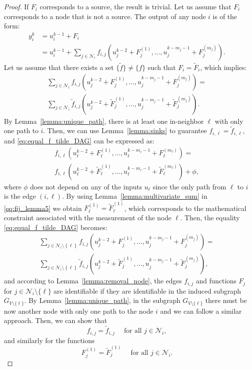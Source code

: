 \documentclass[letterpaper,10pt,journal]{IEEEtran}
\newcommand{\brc}[1]{\left\{#1\right\}}
\newcommand{\NN}{\mathcal{N}}
\begin{document}
\begin{proof}
    If $F_i$ corresponds to a source, the result is trivial. Let us assume that $F_i$ corresponds to a node that is not a source. 
    The output of any node $i$ is of the form:
    \begin{align}
        y_i^k&=u_i^{k-1}+F_i\nonumber\\
        &=u_i^{k-1}\!+\!\sum_{j\in\NN_i}\!f_{i,j}(u_{j}^{k-2}\!+\!F_{j}^{(1)},\ldots,u_{j}^{k-m_{j}-1}\!+\!F_{j}^{(m_{j})}).\nonumber
    \end{align}
    Let us assume that
    there exists a set $\{\tilde f\}\neq \{ f\}$ such that $F_i=\tilde F_i$, which implies:
\begin{multline}\label{eq:equal_f_tilde_DAG}
        \sum_{j\in\NN_i}f_{i,j}(u_{j}^{k-2}+F_{j}^{(1)},\ldots,u_{j}^{k-m_{j}-1}+F_{j}^{(m_{j})})=\\
        \sum_{j\in\NN_i}\tilde f_{i,j}(u_{j}^{k-2}+\tilde F_{j}^{(1)},\ldots,u_{j}^{k-m_{j}-1}+\tilde F_{j}^{(m_{j})}).
    \end{multline}
By Lemma~\ref{lemma:unique_path}, there is at least one in-neighbor $\ell$ with only one path to $i$. 
Then, we can use Lemma~\ref{lemma:sinks} to guarantee $f_{i,\ell}=\tilde f_{i,\ell}$, and \eqref{eq:equal_f_tilde_DAG} can be expressed as:
\begin{multline}\label{eq:fij_lemma5}
    f_{i,\ell}(u_{\ell}^{k-2}+F_{\ell}^{(1)},\ldots,u_{\ell}^{k-m_{\ell}-1}+F_{\ell}^{(m_{\ell})})=\\
         f_{i,\ell}(u_{\ell}^{k-2}+\tilde F_{\ell}^{(1)},\ldots,u_{\ell}^{k-m_{\ell}-1}+\tilde F_{\ell}^{(m_{\ell})})+\phi,
\end{multline}
where $\phi$ does not depend on any of the inputs $u_\ell$ since the only path from $\ell$ to $i$ is the edge $(i,\ell)$. 
By using Lemma~\ref{lemma:multivariate_sum} in \eqref{eq:fij_lemma5} we obtain $F_{\ell}^{(1)}=\tilde F_{\ell}^{(1)}$, which corresponds to the mathematical constraint associated with the measurement of the node $\ell$.
Then, the equality \eqref{eq:equal_f_tilde_DAG} becomes:
\begin{multline}\label{eq:node_i2_Volterra}
\sum_{j\in\NN_i\setminus\brc{\ell}}f_{i,j}(u_{j}^{k-2}+F_{j}^{(1)},\ldots,u_{j}^{k-m_{j}-1}+F_{j}^{(m_{j})})=\\
\sum_{j\in\NN_i\setminus\brc{\ell}}\tilde f_{i,j}(u_{j}^{k-2}+\tilde F_{j}^{(1)},\ldots,u_{j}^{k-m_{j}-1}+\tilde F_{j}^{(m_{j})}),
\end{multline}
and according to Lemma~\ref{lemma:removal_node}, the edges $f_{i,j}$ and functions $F_j$ for $j\in\NN_i\setminus\{\ell\}$ are identifiable if they are identifiable in the induced subgraph $G_{V\setminus\{ \ell\}}$.
By Lemma~\ref{lemma:unique_path}, in the subgraph $G_{V\setminus\{ \ell\}}$ there must be now another node with only one path to the node $i$ and we can follow a similar approach. Then, we can show that 
$$
f_{i,j}=\tilde f_{i,j} \quad \text{ for all } j\in\NN_i,
$$
and similarly for the functions
$$
F_j^{(1)}=\tilde F_j^{(1)} \quad \text{ for all } j\in\NN_i.
$$
\end{proof}
\end{document}
